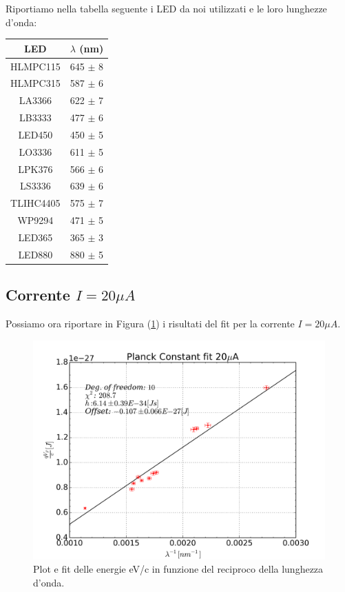\documentclass[journal, a4paper]{IEEEtran}
\begin{document}
Riportiamo nella tabella seguente i LED da noi utilizzati e le loro lunghezze d'onda:

{
\centering

\begin{tabular}{|c|c|}
\hline \textbf{LED} & \textbf{$\lambda$ (nm)} \\ 
\hline HLMPC115 & 645 $\pm$ 8 \\ 
\hline HLMPC315 & 587 $\pm$ 6 \\ 
\hline LA3366 & 622 $\pm$ 7 \\ 
\hline LB3333 & 477 $\pm$ 6 \\ 
\hline LED450 & 450 $\pm$ 5 \\ 
\hline LO3336 & 611 $\pm$ 5 \\ 
\hline LPK376 & 566 $\pm$ 6 \\ 
\hline LS3336 & 639 $\pm$ 6 \\ 
\hline TLIHC4405 & 575 $\pm$ 7 \\ 
\hline WP9294 & 471 $\pm$ 5 \\ 
\hline LED365 & 365 $\pm$ 3 \\ 
\hline LED880 & 880 $\pm$ 5 \\ 
\hline 
\end{tabular} 


}

\subsection{Corrente $I = 20 \mu \si{A}$}

Possiamo ora riportare in Figura (\ref{fig:costante_planck_20ua}) i risultati del fit per la corrente $I = 20 \mu \si{A}$.

\begin{figure}
\centering
\includegraphics[width=0.9\linewidth]{./costante_planck_20ua}
\caption{Plot e fit delle energie eV/c in funzione del reciproco della lunghezza d'onda.}
\label{fig:costante_planck_20ua}
\end{figure}
\end{document}
